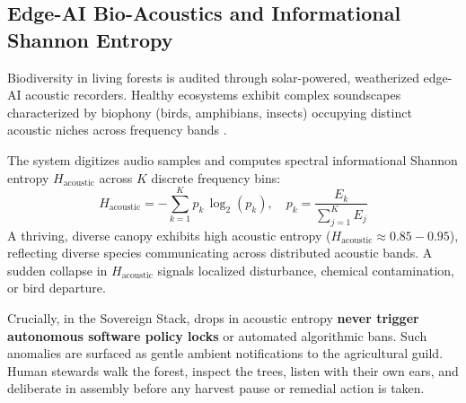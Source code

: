 \subsection{Edge-AI Bio-Acoustics and Informational Shannon Entropy}
Biodiversity in living forests is audited through solar-powered, weatherized edge-AI acoustic recorders. Healthy ecosystems exhibit complex soundscapes characterized by biophony (birds, amphibians, insects) occupying distinct acoustic niches across frequency bands \cite{pijanowski2011soundscape}.

The system digitizes audio samples and computes spectral informational Shannon entropy $H_{\mathrm{acoustic}}$ across $K$ discrete frequency bins:
\begin{equation}
H_{\mathrm{acoustic}} = - \sum_{k=1}^{K} p_k \, \log_2(p_k), \quad p_k = \frac{E_k}{\sum_{j=1}^K E_j}
\label{eq:acoustic_entropy}
\end{equation}
A thriving, diverse canopy exhibits high acoustic entropy ($H_{\mathrm{acoustic}} \approx 0.85 - 0.95$), reflecting diverse species communicating across distributed acoustic bands. A sudden collapse in $H_{\mathrm{acoustic}}$ signals localized disturbance, chemical contamination, or bird departure.

Crucially, in the Sovereign Stack, drops in acoustic entropy \textbf{never trigger autonomous software policy locks} or automated algorithmic bans. Such anomalies are surfaced as gentle ambient notifications to the agricultural guild. Human stewards walk the forest, inspect the trees, listen with their own ears, and deliberate in assembly before any harvest pause or remedial action is taken.

